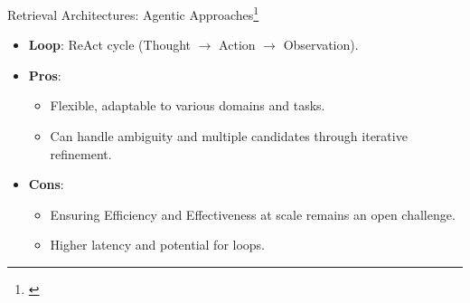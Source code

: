 \documentclass[aspectratio=169]{beamer}
\begin{document}
\begin{frame}{Retrieval Architectures: Agentic Approaches\footnote{\cite{grasp-walter-bast-2025,grasp-entity-linking-2025}}}
    \begin{itemize}
      \item \textbf{Loop}: ReAct cycle (Thought $\rightarrow$ Action $\rightarrow$ Observation).
      \item \textbf{Pros}:
      \begin{itemize}
        \item Flexible, adaptable to various domains and tasks.
        \item Can handle ambiguity and multiple candidates through iterative refinement.
      \end{itemize}
      \item \textbf{Cons}: 
      \begin{itemize}
        \item Ensuring Efficiency and Effectiveness at scale remains an open challenge.
        \item Higher latency and potential for loops.
      \end{itemize}
      
    \end{itemize}
\end{frame}
\end{document}
